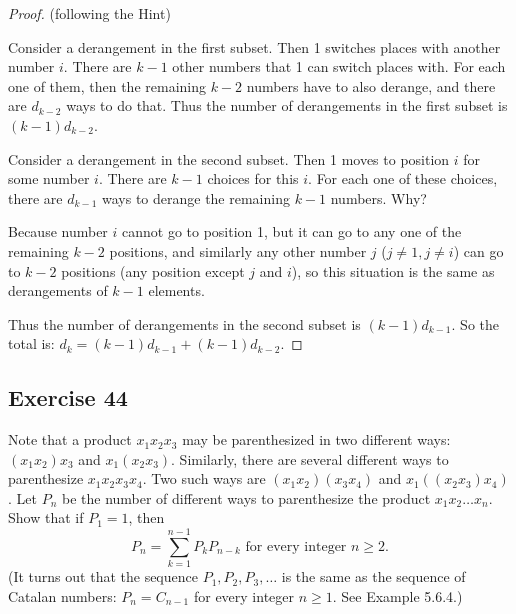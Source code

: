 \documentclass[14pt]{extarticle}
\begin{document}
\begin{proof}
(following the Hint) 

Consider a derangement in the first subset. Then 1 switches places with another number $i$. There are $k-1$ other 
numbers that 1 can switch places with. For each one of them, then the remaining \(k-2\) numbers have to also 
derange, and there are \(d_{k-2}\) ways to do that. Thus the number of derangements in the first subset is 
\((k-1)d_{k-2}\).

Consider a derangement in the second subset. Then 1 moves to position $i$ for some number $i$. There are $k-1$ 
choices for this $i$. For each one of these choices, there are \(d_{k-1}\) ways to derange the remaining $k-1$ 
numbers. Why? 

Because number $i$ cannot go to position 1, but it can go to any one of the remaining $k-2$ positions, and similarly 
any other number $j$ (\(j \neq 1, j \neq i\)) can go to $k-2$ positions (any position except $j$ and $i$), so this 
situation is the same as derangements of $k-1$ elements. 

Thus the number of derangements in the second subset is \((k-1)d_{k-1}\). So the total is: 
\(d_k = (k - 1)d_{k-1} + (k - 1)d_{k-2}\).
\end{proof}

\subsection{Exercise 44}
Note that a product \(x_1x_2x_3\) may be parenthesized in two different ways: \((x_1x_2)x_3\) and \(x_1(x_2x_3)\). 
Similarly, there are several different ways to parenthesize \(x_1x_2x_3x_4\). Two such ways are \((x_1x_2)(x_3x_4)\) 
and \(x_1((x_2 x_3)x_4)\). Let \(P_n\) be the number of different ways to parenthesize the product \(x_1x_2 \ldots 
x_n\). Show that if \(P_1 = 1\), then 
\[
P_n = \sum_{k=1}^{n-1} P_k P_{n-k} \text{ for every integer  } n \geq 2. 
\]
(It turns out that the sequence \(P_1, P_2, P_3, \ldots\) is the same as the sequence of Catalan numbers: 
\(P_n = C_{n-1}\) for every integer \(n \geq 1\). See Example 5.6.4.)
\end{document}
